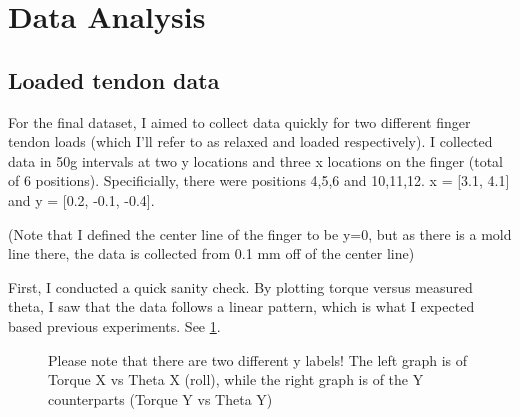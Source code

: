 \documentclass[preprint,12pt,3p]{elsarticle}
\begin{document}
\section{Data Analysis}

\subsection{Loaded tendon data}

For the final dataset, I aimed to collect data quickly for two different finger tendon loads
(which I'll refer to as relaxed and loaded respectively). I collected data in 50g intervals at two y
locations and three x locations on the finger (total of 6 positions).  Specificially, there were
positions 4,5,6 and 10,11,12.  x = [3.1, 4.1] and y = [0.2, -0.1, -0.4].

(Note that I defined the center line of the finger to be y=0, but as there is a mold line there, the
data is collected from 0.1 mm off of the center line)

First, I conducted a quick sanity check. By plotting torque versus measured theta, I saw that the data follows
a linear pattern, which is what I expected based previous experiments. See \cref{fig:sanityload}.

\begin{figure}[tb!]
    \centering 
    \hfil %
        \hfil
        \caption{ Please note that there are two different y labels! The left graph is of Torque X vs Theta X
        (roll), while the right graph is of the Y counterparts (Torque Y vs Theta Y)}
        \label{fig:sanityload}
\end{figure}
\end{document}
